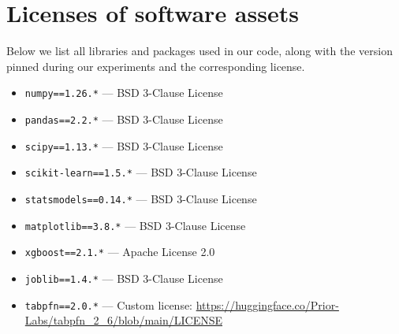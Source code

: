 \section{Licenses of software assets}
\label{appendix:licenses}

Below we list all libraries and packages used in our code, along with the version pinned during our experiments and the corresponding license.

\begin{itemize}
    \item \texttt{numpy==1.26.*} --- BSD 3-Clause License
    \item \texttt{pandas==2.2.*} --- BSD 3-Clause License
    \item \texttt{scipy==1.13.*} --- BSD 3-Clause License
    \item \texttt{scikit-learn==1.5.*} --- BSD 3-Clause License
    \item \texttt{statsmodels==0.14.*} --- BSD 3-Clause License
    \item \texttt{matplotlib==3.8.*} --- BSD 3-Clause License
    \item \texttt{xgboost==2.1.*} --- Apache License 2.0
    \item \texttt{joblib==1.4.*} --- BSD 3-Clause License
    \item \texttt{tabpfn==2.0.*} --- Custom license: \url{https://huggingface.co/Prior-Labs/tabpfn_2_6/blob/main/LICENSE}
\end{itemize}